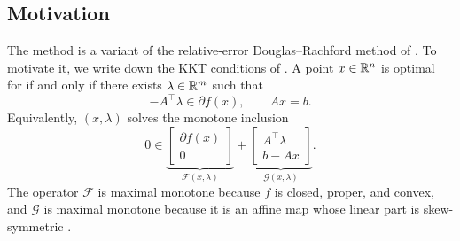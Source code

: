 \documentclass[11pt]{article}
\begin{document}
\subsection{Motivation}
The method is a variant of the relative-error Douglas--Rachford method of \citet{EcksteinRelativeError2018}.
To motivate it, we write down the KKT conditions of .
A point $x\in\mathbb{R}^n$ is optimal for  if and only if there exists $\lambda\in\mathbb{R}^m$ such that
\begin{equation}\label{eq:kkt-conditions}
    -A^\top \lambda \in \partial f (x), \qquad Ax = b.
\end{equation}
Equivalently, $(x, \lambda)$ solves the monotone inclusion
\begin{equation}\label{eq:monotone-inclusion-kkt}
    0 \in \underbrace{\begin{bmatrix}
        \partial f (x) \\ 0
    \end{bmatrix}}_{\mathcal{F}(x,\lambda)} + \underbrace{\begin{bmatrix}
        A^\top \lambda \\ b - Ax
    \end{bmatrix}}_{\mathcal{G}(x,\lambda)}.
\end{equation}
The operator $\mathcal{F}$ is maximal monotone because $f$ is closed, proper, and convex, and $\mathcal{G}$ is maximal monotone because it is an affine map whose linear part is skew-symmetric \citep{BauschkeConvexAnalysisResolventsOfMonotoneOperators}.
\end{document}
